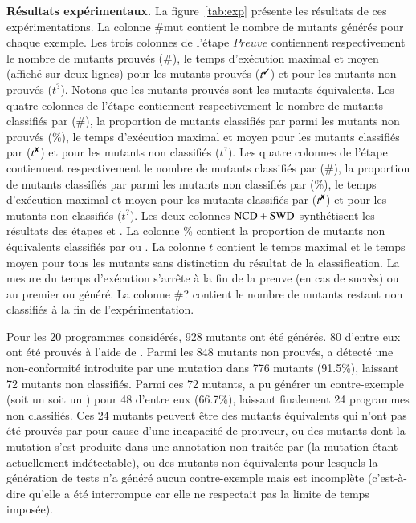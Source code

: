 \textbf{Résultats expérimentaux.}
La figure~\ref{tab:exp} présente les résultats de ces expérimentations.
La colonne \#mut contient le nombre de mutants générés pour chaque exemple.
Les trois colonnes de l'étape $Preuve$ contiennent respectivement le nombre de
mutants prouvés (\#\ok), le temps d'exécution maximal et moyen (affiché sur
deux lignes) pour les mutants prouvés ($t^\text{\ok}$) et pour les mutants non
prouvés ($t^\text{?}$).
Notons que les mutants prouvés sont les mutants équivalents.
Les quatre colonnes de l'étape \NCD contiennent respectivement le nombre de
mutants classifiés par \NCD (\#\ko), la proportion de mutants classifiés par
\NCD parmi les mutants non prouvés (\%), le temps d'exécution maximal et moyen
pour les mutants classifiés par \NCD ($t^\text{\ko}$) et pour les mutants non
classifiés ($t^\text{?}$).
Les quatre colonnes de l'étape \SWD contiennent respectivement le nombre de
mutants classifiés par \SWD (\#\ko), la proportion de mutants classifiés par
\SWD parmi les mutants non classifiés par \NCD (\%), le temps d'exécution
maximal et moyen pour les mutants classifiés par \SWD ($t^\text{\ko}$) et pour
les mutants non classifiés ($t^\text{?}$).
Les deux colonnes $\mathrm{NCD}+\mathrm{SWD}$ synthétisent les résultats des étapes \NCD et
\SWD.
La colonne \% contient la proportion de mutants non équivalents classifiés par
\NCD ou \SWD.
La colonne $t$ contient le temps maximal et le temps moyen pour tous
les mutants sans distinction du résultat de la classification.
La mesure du temps d'exécution s'arrête à la fin de la preuve (en cas de succès)
ou au premier \NCCE ou \SWCE généré.
La colonne \#? contient le nombre de mutants restant non classifiés à la fin
de l'expérimentation.

Pour les 20 programmes considérés, 928 mutants ont été générés.
80 d'entre eux ont été prouvés à l'aide de \Wp.
Parmi les 848 mutants non prouvés, \NCD a détecté une non-conformité introduite
par une mutation dans 776 mutants (91.5\%), laissant 72 mutants non classifiés.
Parmi ces 72 mutants, \SWD a pu générer un contre-exemple (soit un \NCCE soit un
\SWCE) pour 48 d'entre eux (66.7\%), laissant finalement 24 programmes non
classifiés.
Ces 24 mutants peuvent être des mutants équivalents qui n'ont pas été
prouvés par \Wp pour cause d'une incapacité de prouveur, ou des mutants dont la
mutation s'est produite dans une annotation non traitée par \stady (la mutation
étant actuellement indétectable), ou des mutants non équivalents pour
lesquels la génération de tests n'a généré aucun contre-exemple mais est
incomplète (c'est-à-dire qu'elle a été interrompue car elle ne respectait pas la
limite de temps imposée).

